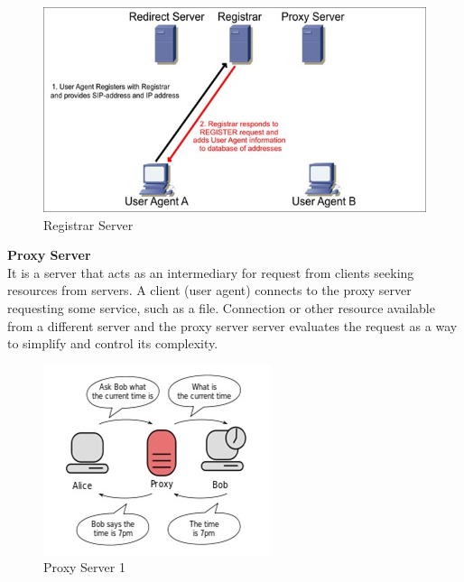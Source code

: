 \documentclass[a4paper]{article}
\begin{document}
\begin{center}
\begin{figure}[H]
\includegraphics[width=1\linewidth]{./pictures/Registrar.JPG}
\caption{\label{fig:Registrar Server} Registrar Server}
\end{figure}
\end{center}

\textbf{Proxy Server\\}
It is a server that acts as an intermediary for request from clients seeking resources from servers.
A client (user agent) connects to the proxy server requesting some service, such as a file. Connection or other resource available from a different server and the proxy server server evaluates the request as a way to simplify and control its complexity.

\begin{center}
\begin{figure}[H]
\includegraphics[width=0.7\linewidth]{./pictures/proxy1.JPG}
\caption{\label{fig:Proxy Server1} Proxy Server 1}
\end{figure}
\end{center}
\end{document}
